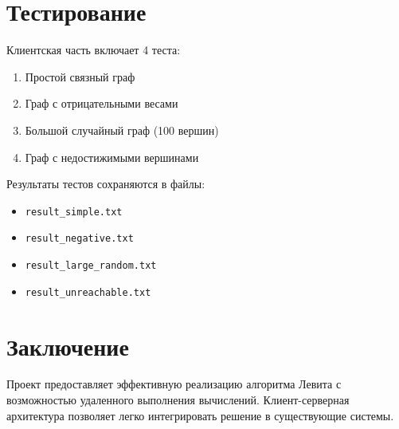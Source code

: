 \documentclass{article}
\begin{document}
\section{Тестирование}
Клиентская часть включает 4 теста:
\begin{enumerate}
    \item Простой связный граф
    \item Граф с отрицательными весами
    \item Большой случайный граф (100 вершин)
    \item Граф с недостижимыми вершинами
\end{enumerate}

Результаты тестов сохраняются в файлы:
\begin{itemize}
    \item \texttt{result\_simple.txt}
    \item \texttt{result\_negative.txt}
    \item \texttt{result\_large\_random.txt}
    \item \texttt{result\_unreachable.txt}
\end{itemize}

\section{Заключение}
Проект предоставляет эффективную реализацию алгоритма Левита с возможностью удаленного выполнения вычислений. Клиент-серверная архитектура позволяет легко интегрировать решение в существующие системы.
\end{document}
